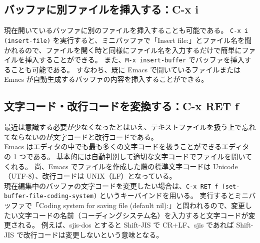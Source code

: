 \subsection{バッファに別ファイルを挿入する：C-x i}
現在開いているバッファに別のファイルを挿入することも可能である。
\texttt{C-x i (insert-file)} を実行すると、ミニバッファで「Insert file:」とファイル名を聞かれるので、ファイルを開く時と同様にファイル名を入力するだけで簡単にファイルを挿入することができる。
また、\texttt{M-x insert-buffer} でバッファを挿入することも可能である。
すなわち、既に Emacs で開いているファイルまたは Emacs が自動生成するバッファの内容を挿入することができる。
\subsection{文字コード・改行コードを変換する：C-x RET f}
最近は意識する必要が少なくなったとはいえ、テキストファイルを扱う上で忘れてならないのが文字コードと改行コードである。\\

Emacs はエディタの中でも最も多くの文字コードを扱うことができるエディタの 1 つである。
基本的には自動判別して適切な文字コードでファイルを開いてくれる。
尚、Emacs でファイルを作成した際の標準文字コードは Unicode（UTF-8）、改行コードは UNIX（LF）となっている。\\

現在編集中のバッファの文字コードを変更したい場合は、\texttt{C-x RET f (set-buffer-file-coding-system)} というキーバインドを用いる。
実行するとミニバッファで「Coding system for saving file (default nil):」と問われるので、変更したい文字コードの名前（コーディングシステム名）を入力すると文字コードが変更される。
例えば、sjis-dos とすると Shift-JIS で CR+LF、sjis であれば Shift-JIS で改行コードは変更しないという意味となる。\\

